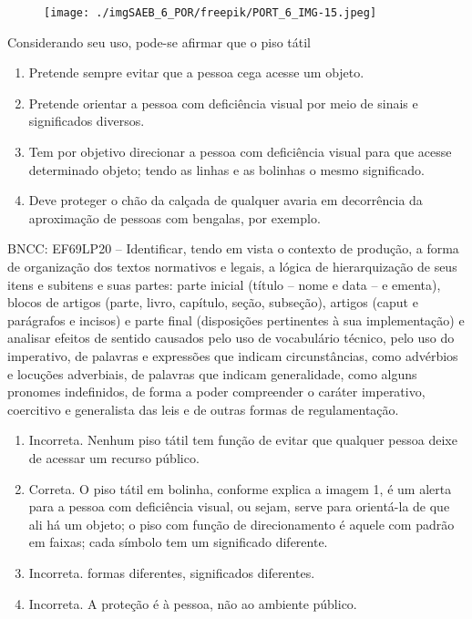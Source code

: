 \begin{figure}
\texttt{[image: ./imgSAEB\_6\_POR/freepik/PORT\_6\_IMG-15.jpeg]}
\end{figure}

Considerando seu uso, pode-se afirmar que o piso tátil

\begin{enumerate}
\def\labelenumi{\alph{enumi})}
\item Pretende sempre evitar que a pessoa cega acesse um objeto.
\item Pretende orientar a pessoa com deficiência visual por meio de sinais
e significados diversos.
\item Tem por objetivo direcionar a pessoa com deficiência visual para que
acesse determinado objeto; tendo as linhas e as bolinhas o mesmo
significado.
\item Deve proteger o chão da calçada de qualquer avaria em decorrência da
aproximação de pessoas com bengalas, por exemplo.
\end{enumerate}

BNCC: EF69LP20 -- Identificar, tendo em vista o contexto de produção, a
forma de organização dos textos normativos e legais, a lógica de
hierarquização de seus itens e subitens e suas partes: parte inicial
(título -- nome e data -- e ementa), blocos de artigos (parte, livro,
capítulo, seção, subseção), artigos (caput e parágrafos e incisos) e
parte final (disposições pertinentes à sua implementação) e analisar
efeitos de sentido causados pelo uso de vocabulário técnico, pelo uso do
imperativo, de palavras e expressões que indicam circunstâncias, como
advérbios e locuções adverbiais, de palavras que indicam generalidade,
como alguns pronomes indefinidos, de forma a poder compreender o caráter
imperativo, coercitivo e generalista das leis e de outras formas de
regulamentação.

\begin{enumerate}
\def\labelenumi{\alph{enumi})}
\item Incorreta. Nenhum piso tátil tem função de evitar que qualquer pessoa
deixe de acessar um recurso público.
\item Correta. O piso tátil em bolinha, conforme explica a imagem 1, é um
alerta para a pessoa com deficiência visual, ou sejam, serve para
orientá-la de que ali há um objeto; o piso com função de direcionamento
é aquele com padrão em faixas; cada símbolo tem um significado
diferente.
\item Incorreta. formas diferentes, significados diferentes.
\item Incorreta. A proteção é à pessoa, não ao ambiente público.
\end{enumerate}


